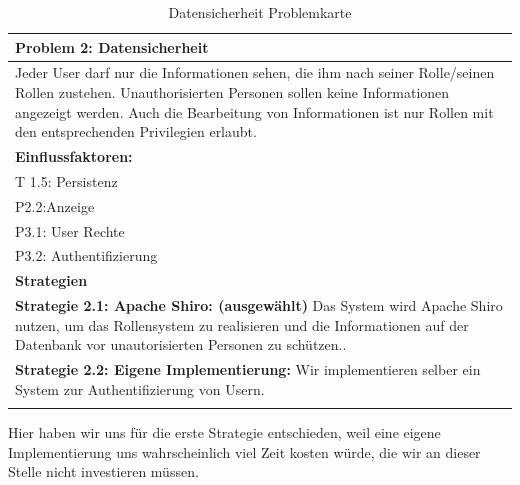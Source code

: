 \documentclass[enabledeprecatedfontcommands,fontsize=12pt,paper=a4,twoside]{scrartcl}
\begin{document}
\begin{table}[H]
    \centering
    \begin{tabular}{|p{15cm}|}
    \hline
          \textbf{Problem 2:} Datensicherheit \\ \hline
          Jeder User darf nur die Informationen sehen, die ihm nach seiner Rolle/seinen Rollen zustehen. Unauthorisierten Personen sollen keine Informationen angezeigt werden. Auch die Bearbeitung von Informationen ist nur Rollen mit den entsprechenden Privilegien erlaubt. \\ \hline
          \textbf{Einflussfaktoren: } \\
          T 1.5: Persistenz \\
	P2.2:Anzeige \\
	P3.1: User Rechte \\
	P3.2: Authentifizierung \\
         \hline
          \textbf{Strategien} \\ \hline
          \textbf{Strategie 2.1: Apache Shiro: (ausgewählt)} Das System wird Apache Shiro nutzen, um das Rollensystem zu realisieren und die Informationen auf der Datenbank vor unautorisierten Personen zu schützen.. \\ 
           \textbf{Strategie 2.2: Eigene Implementierung:} Wir implementieren selber ein System zur Authentifizierung von Usern. \\
          \\ \hline
    \end{tabular}
    \caption{Datensicherheit Problemkarte}
    \label{tab:ProblemKarte2}
\end{table}
Hier haben wir uns für die erste Strategie entschieden, weil eine eigene Implementierung uns wahrscheinlich viel Zeit kosten würde, die wir an dieser Stelle nicht investieren müssen. \\
\end{document}
